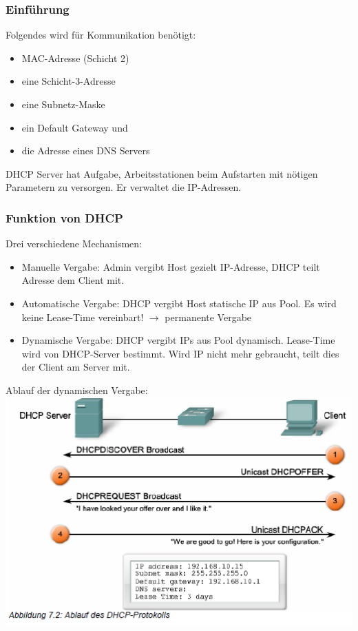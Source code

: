 \documentclass[landscape,twocolumn,a4paper]{article}
\newcommand{\ra}{\rightarrow}
\begin{document}
\begin{footnotesize}
\subsubsection{Einführung}
Folgendes wird für Kommunikation benötigt:
\begin{itemize}
	\item MAC-Adresse (Schicht 2)
	\item eine Schicht-3-Adresse
	\item eine Subnetz-Maske
	\item ein Default Gateway und
	\item die Adresse eines DNS Servers
\end{itemize}
DHCP Server hat Aufgabe, Arbeitsstationen beim Aufstarten mit nötigen Parametern zu versorgen. Er verwaltet die IP-Adressen.
\subsubsection{Funktion von DHCP}
Drei verschiedene Mechanismen:
\begin{itemize}
	\item Manuelle Vergabe: Admin vergibt Host gezielt IP-Adresse, DHCP teilt Adresse dem Client mit.
	\item Automatische Vergabe: DHCP vergibt Host statische IP aus Pool. Es wird keine Lease-Time vereinbart! $\ra$ permanente Vergabe
	\item Dynamische Vergabe: DHCP vergibt IPs aus Pool dynamisch. Lease-Time wird von DHCP-Server bestimmt. Wird IP nicht mehr gebraucht, teilt dies der Client am Server mit.
\end{itemize}
Ablauf der dynamischen Vergabe:\\
\includegraphics[scale=0.5]{ablauf-dhcp-protokoll.png}


\end{footnotesize}
\end{document}
